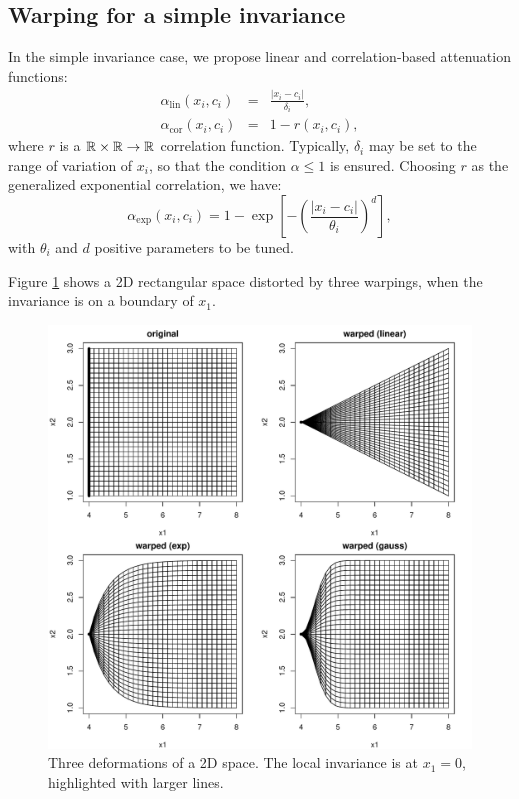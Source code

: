 \subsection{Warping for a simple invariance}
In the simple invariance case, we propose linear and correlation-based attenuation functions: 
\begin{eqnarray}
 \alpha_\text{lin}(x_i, c_i) &=& \frac{\lvert x_i - c_i \rvert}{\delta_i}, \\
 \alpha_\text{cor}(x_i, c_i) &=& 1 - r(x_i, c_i),
\end{eqnarray}
where $r$ is a $\mathbb{R} \times \mathbb{R}\rightarrow \mathbb{R}$ correlation function.
Typically, $\delta_i$ may be set to the range of variation of $x_i$, so that the condition $\alpha \leq 1$ is ensured.
Choosing $r$ as the generalized exponential correlation, we have:
\begin{equation}\label{eq:covw}
   \alpha_\text{exp}(x_i, c_i) = 1 - \exp \left[ - \left(\frac{\lvert x_i - c_i \rvert}{\theta_i}\right)^d \right],
\end{equation}
with $\theta_i$ and $d$ positive parameters to be tuned. 

Figure \ref{fig:3defsimple} shows a 2D rectangular space distorted by three warpings, when the invariance is on a boundary of $x_1$.

\begin{figure}[!ht]
\centering
 \includegraphics[width=.8\textwidth]{def2Dsimple.pdf}
 \caption{Three deformations of a 2D space. The local invariance is at $x_1=0$, highlighted with larger lines.}\label{fig:3defsimple} 
\end{figure}

